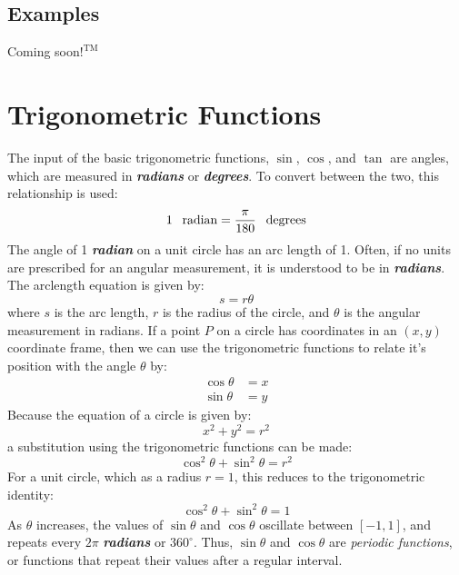 \begin{center}
\section*{\small Examples}
Coming soon$!^{\text{TM}}$
\end{center}

\section{Trigonometric Functions}
The input of the basic trigonometric functions, $\sin$, $\cos$, and $\tan$ are angles, which are measured in \textbf{\textit{radians}} or \textbf{\textit{degrees}}. To convert between the two, this relationship is used:
\begin{equation}
1 \hphantom{-} \text{radian} = \frac{\pi}{180} \hphantom{-} \text{degrees}
\end{equation}
The angle of 1 \textbf{\textit{radian}} on a unit circle has an arc length of 1. Often, if no units are prescribed for an angular measurement, it is understood to be in \textit{\textbf{radians}}. The arclength equation is given by:
\begin{equation}
s = r\theta
\end{equation}
where $s$ is the arc length, $r$ is the radius of the circle, and $\theta$ is the angular measurement in radians. If a point $P$ on a circle has coordinates in an $(x, y)$ coordinate frame, then we can use the trigonometric functions to relate it's position with the angle $\theta$ by:
\begin{align}
\cos\theta &= x\\
\sin\theta &= y
\end{align}
Because the equation of a circle is given by:
\begin{equation}
x^2 + y^2 = r^2
\end{equation}
a substitution using the trigonometric functions can be made:
\begin{equation}
\cos^2 \theta + \sin^2 \theta = r^2
\end{equation}
For a unit circle, which as a radius $r = 1$, this reduces to the trigonometric identity:
\begin{equation}
\cos^2 \theta + \sin^2 \theta = 1
\end{equation}
As $\theta$ increases, the values of $\sin\theta$ and $\cos\theta$ oscillate between $\left[-1, 1\right]$, and repeats every $2\pi$ \textbf{\textit{radians}} or $360^\circ$. Thus, $\sin \theta$ and $\cos \theta$ are \textit{periodic functions}, or functions that repeat their values after a regular interval.

